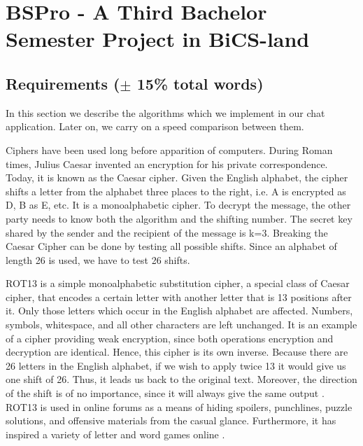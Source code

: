 \section{BSPro - A Third Bachelor Semester Project in BiCS-land}
\subsection{Requirements ($\pm$ 15\% total words)}

In this section we describe the algorithms which we implement in our chat application. Later on, we carry on a speed comparison between them. 

Ciphers have been used long before apparition of computers. During Roman times, Julius Caesar invented an encryption for his private correspondence. Today, it is known as the Caesar cipher. Given the English alphabet, the cipher shifts a letter from the alphabet three places to the right, i.e. A is encrypted as D, B as E, etc. It is a monoalphabetic cipher. To decrypt the message, the other party needs to know both the algorithm and the shifting number. The secret key shared by the sender and the recipient of the message is k=3. Breaking the Caesar Cipher can be done by testing all possible shifts. Since an alphabet of length 26 is used, we have to test 26 shifts. 

ROT13 is a simple monoalphabetic substitution cipher, a special class of Caesar cipher, that encodes a certain letter with another letter that is 13 positions after it. Only those letters which occur in the English alphabet are affected. Numbers, symbols, whitespace, and all other characters are left unchanged. It is an example of a cipher providing weak encryption, since both operations encryption and decryption are identical. Hence, this cipher is its own inverse. Because there are 26 letters in the English alphabet, if we wish to apply twice 13 it would give us one shift of 26. Thus, it leads us back to the original text. Moreover, the direction of the shift is of no importance, since it will always give the same output \cite{swenson2008modern}.
ROT13 is used in online forums as a means of hiding spoilers, punchlines, puzzle solutions, and offensive materials from the casual glance. Furthermore, it has inspired a variety of letter and word games online \cite{wikirot13}. 

